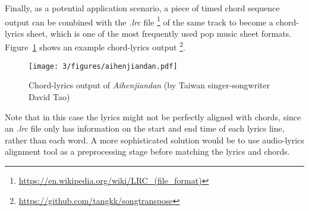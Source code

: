 Finally, as a potential application scenario, a piece of timed chord sequence output can be combined with the \textit{.lrc} file \footnote{\url{https://en.wikipedia.org/wiki/LRC\_(file\_format)}} of the same track to become a chord-lyrics sheet, which is one of the most frequently used pop music sheet formats. Figure~\ref{fig:3-aihenjiandan} shows an example chord-lyrics output \footnote{\url{https://github.com/tangkk/songtranspose}}.
\begin{figure}[h]
    \centering
        \texttt{[image: 3/figures/aihenjiandan.pdf]}
    \caption{Chord-lyrics output of \textit{Aihenjiandan} (by Taiwan singer-songwriter David Tao)}
    \label{fig:3-aihenjiandan}
\end{figure}
Note that in this case the lyrics might not be perfectly aligned with chords, since an \textit{.lrc} file only has information on the start and end time of each lyrics line, rather than each word. A more sophisticated solution would be to use audio-lyrics alignment tool \cite{mauch2010lyrics} as a preprocessing stage before matching the lyrics and chords.



